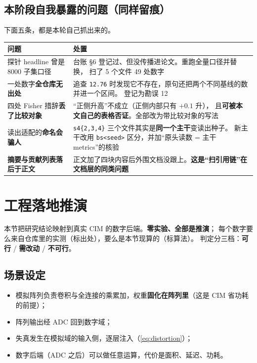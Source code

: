 \documentclass[11pt,a4paper]{ctexart}
\begin{document}
\subsection{本阶段自我暴露的问题（同样留痕）}

下面五条，都是本轮自己抓出来的。

\begin{center}
\small
\begin{tabular}{p{3.6cm}p{10.2cm}}
\toprule
问题 & 处置 \\
\midrule
探针 headline 曾是 8000 子集口径 & 台账 §6 登记过、但没传播进论文。重跑全量口径并替换，
  扫了 5 个文件 49 处数字 \\
一处数字\textbf{全仓库无出处} & 追查 \texttt{12.76} 时发现它不存在，原句还把两个不同基线的数并进一个区间。
  登记为勘误 12 \\
四处 Fisher 措辞\textbf{丢了比较对象} & “正侧升高”不成立（正侧内部只有 $+0.1$ 升），
  且\textbf{可被本文自己的表格否证}。全部改为带比较对象的写法 \\
读出适配的\textbf{命名会骗人} & \texttt{s4\{2,3,4\}} 三个文件其实是\textbf{同一个主干}变读出种子。
  新主干改用 \texttt{bs<seed>} 区分，并加“原头读数 = 主干 metrics”的核验 \\
\textbf{摘要与贡献列表落后于正文} & 正文加了四块内容后外围文档没跟上。\textbf{这是“扫引用链”在文档层的同类问题} \\
\bottomrule
\end{tabular}
\end{center}

\section{工程落地推演}
\label{sec:deploy}

本节把研究结论映射到真实 CIM 的数字后端。\textbf{零实验、全部是推演}；
每个数字要么来自仓库里的实测（标出处），要么是本节现算的（标算法）。
判定分三档：\textbf{可行} / \textbf{需改动} / \textbf{不可行}。

\subsection{场景设定}

\begin{itemize}[leftmargin=2em,itemsep=2pt]
  \item 模拟阵列负责卷积与全连接的乘累加，权重\textbf{固化在阵列里}（这是 CIM 省功耗的前提）；
  \item 阵列输出经 ADC 回到数字域；
  \item 失真发生在模拟域的输入侧，逐层注入（\cref{eq:distortion}）；
  \item 数字后端（ADC 之后）可以做任意运算，代价是面积、延迟、功耗。
\end{itemize}
\end{document}
